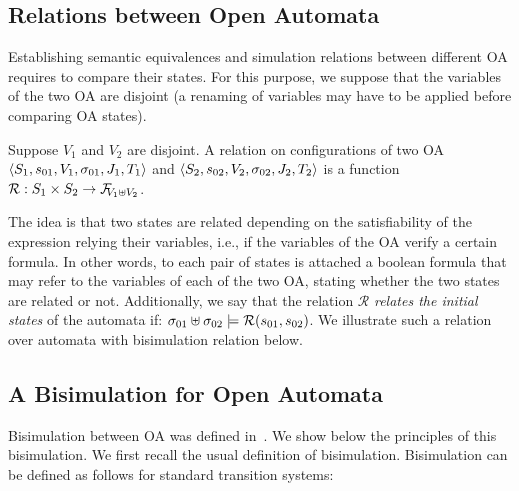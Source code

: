 \documentclass[runningheads]{llncs}
\begin{document}
\subsection{Relations between Open Automata}
Establishing semantic equivalences and simulation relations between different OA requires  to compare their states. For this purpose, we suppose that the variables of the two OA are disjoint (a renaming of variables may have to be applied before comparing OA states).
\begin{definition} Suppose $V_1$ and $V_2$ are disjoint.
A relation on configurations of two OA \(\OAg[1]\) and \(\OAg[2]\) is a function \( \mathcal{R}: S_1 \times S_2 \to \rformulas[V_1 \uplus V_2]\).
\end{definition}
The idea is that two states are related depending on the satisfiability of the expression relying their variables, i.e., if the variables of the OA verify a certain formula. 
In other words, to each pair of states is attached a boolean formula that may refer to the  variables of each of the two OA, stating whether the two states are related or not.
Additionally, we say that the relation $ \mathcal{R}$ \emph{relates the initial states} of the automata if: \(\sigma_{01} \uplus \sigma_{02} \models  \mathcal{R}\mpar{s_{01}, s_{02}}\).
We illustrate such a relation over automata with bisimulation relation below.


\subsection{A Bisimulation for Open Automata}

Bisimulation between OA was defined in~\cite{AMHEEMA:2023}.  We show below the principles of this bisimulation. We first recall the usual definition of bisimulation.
Bisimulation can  be defined as follows for standard transition systems: 
\end{document}
